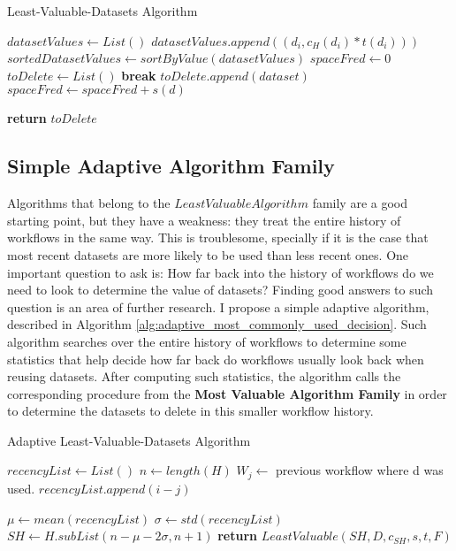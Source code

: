 \begin{algorithm}
\begin{singlespace}
\caption{Least-Valuable-Datasets Algorithm}
\label{alg:most_commonly_used_decision}
\begin{algorithmic}[1]
	\State $datasetValues \gets List()$
		\State $datasetValues.append((d_i, c_H(d_i) * t(d_i)))$
	\EndFor
	\State $sortedDatasetValues \gets sortByValue(datasetValues)$
	\State $spaceFred \gets 0$
	\State $toDelete \gets List()$
			\State \textbf{break}
		\EndIf	
		\State $toDelete.append(dataset)$
		\State $spaceFred \gets spaceFred + s(d)$
	\EndFor
	
	\State \textbf{return} $toDelete$
\EndProcedure
\end{algorithmic}
\end{singlespace}
\end{algorithm}

\subsection{Simple Adaptive Algorithm Family}
Algorithms that belong to the $Least Valuable Algorithm$ family are a good starting point, but they have a weakness: they treat the entire history of workflows in the same way.  This is troublesome, specially if it is the case that most recent datasets are more likely to be used than less recent ones.  One important question to ask is: How far back into the history of workflows do we need to look to determine the value of datasets? Finding good answers to such question is an area of further research.  I propose a simple adaptive algorithm, described in Algorithm \ref{alg:adaptive_most_commonly_used_decision}. Such algorithm searches over the entire history of workflows to determine some statistics that help decide how far back do workflows usually look back when reusing datasets. After computing such statistics, the algorithm calls the corresponding procedure from the \textbf{Most Valuable Algorithm Family} in order to determine the datasets to delete in this smaller workflow history.

\begin{algorithm}
\begin{singlespace}
\caption{Adaptive Least-Valuable-Datasets Algorithm}
\label{alg:adaptive_most_commonly_used_decision}
\begin{algorithmic}[1]
	\State $recencyList \gets List()$
	\State $n \gets length(H)$
			\State $W_j \gets$ previous workflow where d was used.
				\State $recencyList.append(i - j)$
			\EndIf
		\EndFor
			
	\EndFor
	\State $\mu \gets mean(recencyList)$
	\State $\sigma \gets std(recencyList)$
	\State $SH \gets H.subList(n - \mu - 2\sigma, n + 1)$
	\State \textbf{return} $LeastValuable(SH, D, c_{SH}, s, t, F)$

\EndProcedure
\end{algorithmic}
\end{singlespace}
\end{algorithm}
